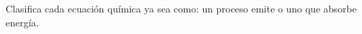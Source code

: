 Clasifica cada ecuación química ya sea como: un proceso emite o uno que absorbe energía.
\begin{parts}
    
    
    
    
    
    
\end{parts}